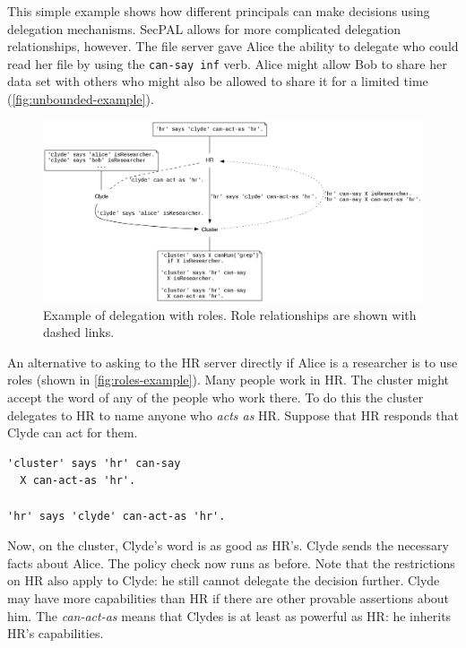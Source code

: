 \documentclass[thesis.tex]{subfiles}
\begin{document}
This simple example shows how different principals can make decisions using delegation mechanisms.
SecPAL allows for more complicated delegation relationships, however. 
The file server gave Alice the ability to delegate who could read her file by using the \texttt{can-say inf} verb.
Alice might allow Bob to share her data set with others who might also be allowed to share it for a limited time (\autoref{fig:unbounded-example}).

\begin{figure}
  \centering
  \includegraphics[width=\textwidth]{figures/secpal-example-roles.png}
  \caption[Example of delegation with roles.]{Example of delegation with roles.  Role relationships are shown with dashed links.}
  \label{fig:roles-example}
\end{figure}

An alternative to asking to the HR server directly if Alice is a
researcher is to use roles (shown in
\autoref{fig:roles-example}). Many people work in HR. The cluster
might accept the word of any of the people who work there. To do this
the cluster delegates to HR to name anyone who \emph{acts as}
HR. Suppose that HR responds that Clyde can act for them.
\begin{lstlisting}
'cluster' says 'hr' can-say
  X can-act-as 'hr'.

'hr' says 'clyde' can-act-as 'hr'.
\end{lstlisting} Now, on the cluster, Clyde's word is as good as HR's. Clyde
sends the necessary facts about Alice. The policy check now runs as before. Note
that the restrictions on HR also apply to Clyde: he still cannot delegate the
decision further. Clyde may have more capabilities than HR if there are other
provable assertions about him. The \emph{can-act-as} means that Clydes is at
least as powerful as HR: he inherits HR's capabilities.
\end{document}
